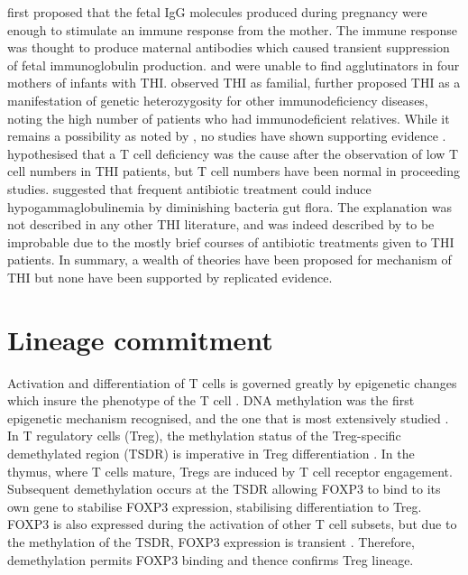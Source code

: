 \documentclass[12pt]{article}
\begin{document}
			\citet{Fudenberg64} first proposed that the fetal IgG molecules produced during pregnancy were enough to stimulate an immune response from the mother. 
			The immune response was thought to produce maternal antibodies which caused transient suppression of fetal immunoglobulin production. 
			\citet{Rosen66} and \citet{Nathenson71} were unable to find agglutinators in four mothers of infants with THI.
			\citet{Willenbockel60} observed THI as familial, \citet{Soothill68} further proposed THI as a manifestation of genetic heterozygosity for other immunodeficiency diseases, noting the high number of patients who had immunodeficient relatives.
			While it remains a possibility as noted by \citet{McGeady87}, no studies have shown supporting evidence \citep{Tiller78,Fiorilli86, Ovadia14}.
			\citet{Siegel81} hypothesised that a T cell deficiency was the cause after the observation of low T cell numbers in THI patients, but T cell numbers have been normal in proceeding studies.
			\citet{McGeady87} suggested that frequent antibiotic treatment could induce hypogammaglobulinemia by diminishing bacteria gut flora. 
			The explanation was not described in any other THI literature, and was indeed described by \citet{McGeady87} to be improbable due to the mostly brief courses of antibiotic treatments given to THI patients.
			In summary, a wealth of theories have been proposed for mechanism of THI but none have been supported by replicated evidence.
			
	\section{Lineage commitment}

		Activation and differentiation of T cells is governed greatly by epigenetic changes which insure the phenotype of the T cell \citep{Zeng13}.
		DNA methylation was the first epigenetic mechanism recognised, and the one that is most extensively studied \citep{Begin14}. 
		In T regulatory cells (Treg), the methylation status of the Treg-specific demethylated region (TSDR) is imperative in Treg differentiation \citep{Polansky08}.
		In the thymus, where T cells mature, Tregs are induced by T cell receptor engagement. 
		Subsequent demethylation occurs at the TSDR allowing FOXP3 to bind to its own gene to stabilise FOXP3 expression, stabilising differentiation to Treg.
		FOXP3 is also expressed during the activation of other T cell subsets, but due to the methylation of the TSDR, FOXP3 expression is transient \citep{Ohkura13}.
		Therefore, demethylation permits FOXP3 binding and thence confirms Treg lineage.
		
\end{document}

